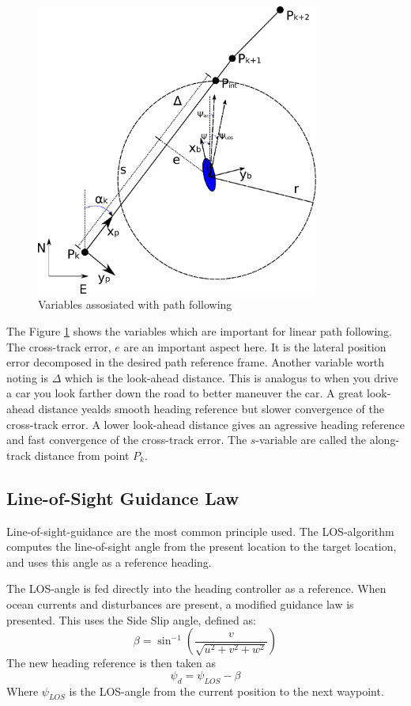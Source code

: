 		\begin{figure}[hbtp]
		\centering
		\includegraphics[width=0.83\textwidth]{pics/waypoint}
		\caption{Variables assosiated with path following}
		\label{fig:ch2-pathfollowing}
	\end{figure}
	The Figure \ref{fig:ch2-pathfollowing} shows the variables which are important for linear path following. The
	cross-track error, $e$ are an important aspect here. It is the lateral position error decomposed in
	the desired path reference frame. Another variable worth noting is $\Delta$ which is the look-ahead
	distance. This is analogus to when you drive a car you look farther down the road to better maneuver
	the car. A great look-ahead distance yealds smooth heading reference but slower convergence of the
	cross-track error. A lower look-ahead distance gives an agressive heading reference and fast
	convergence of the cross-track error. The $s$-variable are called the along-track distance from point
	$P_k$. 
	
	
	\subsection{Line-of-Sight Guidance Law}
	        Line-of-sight-guidance are the most common principle used. The LOS-algorithm computes
		the line-of-sight angle from the present location to the target location, and uses this
		angle as a reference heading.

		The LOS-angle is fed directly into the 
		heading controller as a reference. When ocean currents and disturbances are present, a
		modified guidance law is presented. This uses the Side Slip angle, defined as:
		\begin{equation}
			\label{eq:ch2-sideslip}
			\beta = \sin^{-1} ( \frac{v}{\sqrt{u^2 + v^2 + w^2}})
		\end{equation}
		The new heading reference is then taken as
		\begin{equation}
			\label{eq:ch2-los-law}
			\psi_d = \psi_{LOS} - \beta
		\end{equation}
		Where $\psi_{LOS}$ is the LOS-angle from the current position to the next waypoint. 

